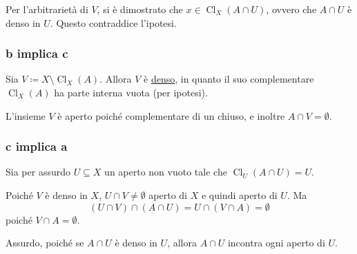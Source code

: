 \documentclass{article}
\newcommand{\1}{\mathds{1}}
\begin{document}
Per l'arbitrarietà di \(V\), si è dimostrato che \(x \in \operatorname{Cl}_{X}(A\cap U)\), ovvero che \(A\cap U\) è denso in \(U\). Questo contraddice l'ipotesi.
\subsubsection{b implica c}
\label{sec:org9ba7aac}

Sia \(V\coloneqq X\setminus \operatorname{Cl}_{X}(A)\). Allora \(V\) è \uline{denso}, in quanto il suo complementare \(\operatorname{Cl}_{X}(A)\) ha parte interna vuota (per ipotesi).

L'insieme \(V\) è aperto poiché complementare di un chiuso, e inoltre \(A\cap V=\emptyset\).
\subsubsection{c implica a}
\label{sec:org06ebdd5}

Sia per assurdo \(U \subseteq X\) un aperto non vuoto tale che \(\operatorname{Cl}_{U}(A\cap U) = U\).

Poiché \(V\) è denso in \(X\), \(U\cap V\neq \emptyset\) aperto di \(X\) e quindi aperto di \(U\). Ma
\begin{equation*}
(U\cap V)\cap (A\cap U) = U\cap (V\cap A) = \emptyset
\end{equation*}
poiché \(V\cap A=\emptyset\).

Assurdo, poiché se \(A\cap U\) è denso in \(U\), allora \(A\cap U\) incontra ogni aperto di \(U\).
\end{document}
